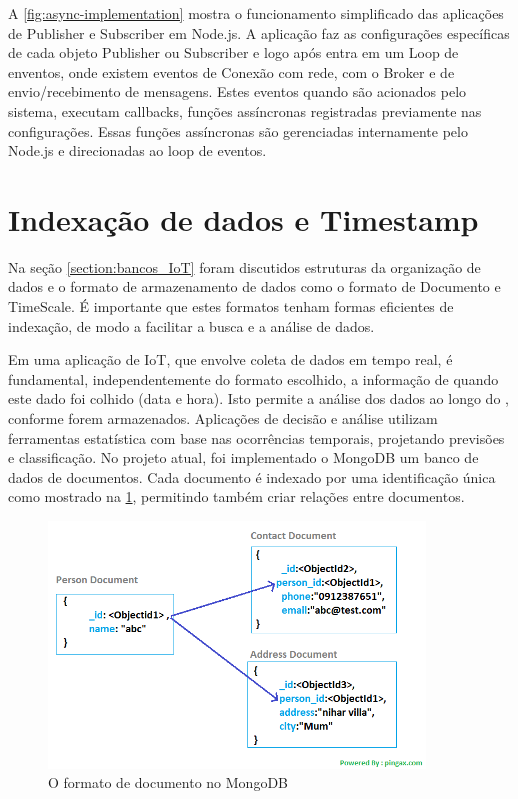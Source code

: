 A \ref{fig:async-implementation} mostra o funcionamento simplificado das aplicações de Publisher e Subscriber em Node.js. A aplicação faz as configurações específicas de cada objeto Publisher ou Subscriber e logo após entra em um Loop de enventos, onde existem eventos de Conexão com rede, com o Broker e de envio/recebimento de mensagens. Estes eventos quando são acionados pelo sistema, executam callbacks, funções assíncronas registradas previamente nas configurações. Essas funções assíncronas são gerenciadas internamente pelo Node.js e direcionadas ao loop de eventos.

\section{Indexação de dados e Timestamp}
\label{section:timestamp}

Na seção \ref{section:bancos_IoT} foram discutidos estruturas da organização de dados e o formato de armazenamento de dados como o formato de Documento e TimeScale. É importante que estes formatos tenham formas eficientes de indexação, de modo a facilitar a busca e a análise de dados.

Em uma aplicação de IoT, que envolve coleta de dados em tempo real, é fundamental, independentemente do formato escolhido, a informação de quando este dado foi colhido (data e hora). Isto permite a análise dos dados ao longo do , conforme forem armazenados. Aplicações de decisão e análise utilizam ferramentas estatística com base nas ocorrências temporais, projetando previsões e classificação. No projeto atual, foi implementado o MongoDB um banco de dados de documentos. Cada documento é indexado por uma identificação única como mostrado na \ref{fig:document-model}, permitindo também criar relações entre documentos.

\begin{figure}[h!]
\centering
\includegraphics[width=10cm]{./02_Capitulos/02_Cap3/figures/document-model}
\caption{O formato de documento no MongoDB}
\label{fig:document-model}
\end{figure}

